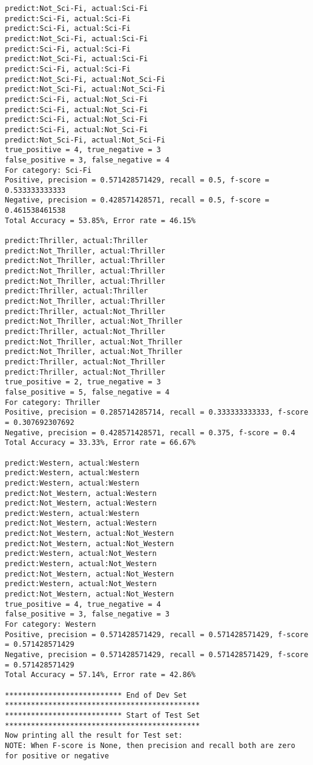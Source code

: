 \documentclass{article}
\begin{document}
\begin{lstlisting}
predict:Not_Sci-Fi, actual:Sci-Fi
predict:Sci-Fi, actual:Sci-Fi
predict:Sci-Fi, actual:Sci-Fi
predict:Not_Sci-Fi, actual:Sci-Fi
predict:Sci-Fi, actual:Sci-Fi
predict:Not_Sci-Fi, actual:Sci-Fi
predict:Sci-Fi, actual:Sci-Fi
predict:Not_Sci-Fi, actual:Not_Sci-Fi
predict:Not_Sci-Fi, actual:Not_Sci-Fi
predict:Sci-Fi, actual:Not_Sci-Fi
predict:Sci-Fi, actual:Not_Sci-Fi
predict:Sci-Fi, actual:Not_Sci-Fi
predict:Sci-Fi, actual:Not_Sci-Fi
predict:Not_Sci-Fi, actual:Not_Sci-Fi
true_positive = 4, true_negative = 3
false_positive = 3, false_negative = 4
For category: Sci-Fi
Positive, precision = 0.571428571429, recall = 0.5, f-score = 0.533333333333 
Negative, precision = 0.428571428571, recall = 0.5, f-score = 0.461538461538 
Total Accuracy = 53.85%, Error rate = 46.15%

predict:Thriller, actual:Thriller
predict:Not_Thriller, actual:Thriller
predict:Not_Thriller, actual:Thriller
predict:Not_Thriller, actual:Thriller
predict:Not_Thriller, actual:Thriller
predict:Thriller, actual:Thriller
predict:Not_Thriller, actual:Thriller
predict:Thriller, actual:Not_Thriller
predict:Not_Thriller, actual:Not_Thriller
predict:Thriller, actual:Not_Thriller
predict:Not_Thriller, actual:Not_Thriller
predict:Not_Thriller, actual:Not_Thriller
predict:Thriller, actual:Not_Thriller
predict:Thriller, actual:Not_Thriller
true_positive = 2, true_negative = 3
false_positive = 5, false_negative = 4
For category: Thriller
Positive, precision = 0.285714285714, recall = 0.333333333333, f-score = 0.307692307692 
Negative, precision = 0.428571428571, recall = 0.375, f-score = 0.4 
Total Accuracy = 33.33%, Error rate = 66.67%

predict:Western, actual:Western
predict:Western, actual:Western
predict:Western, actual:Western
predict:Not_Western, actual:Western
predict:Not_Western, actual:Western
predict:Western, actual:Western
predict:Not_Western, actual:Western
predict:Not_Western, actual:Not_Western
predict:Not_Western, actual:Not_Western
predict:Western, actual:Not_Western
predict:Western, actual:Not_Western
predict:Not_Western, actual:Not_Western
predict:Western, actual:Not_Western
predict:Not_Western, actual:Not_Western
true_positive = 4, true_negative = 4
false_positive = 3, false_negative = 3
For category: Western
Positive, precision = 0.571428571429, recall = 0.571428571429, f-score = 0.571428571429 
Negative, precision = 0.571428571429, recall = 0.571428571429, f-score = 0.571428571429 
Total Accuracy = 57.14%, Error rate = 42.86%

*************************** End of Dev Set *********************************************
*************************** Start of Test Set *********************************************
Now printing all the result for Test set:
NOTE: When F-score is None, then precision and recall both are zero for positive or negative


\end{lstlisting}
\end{document}
